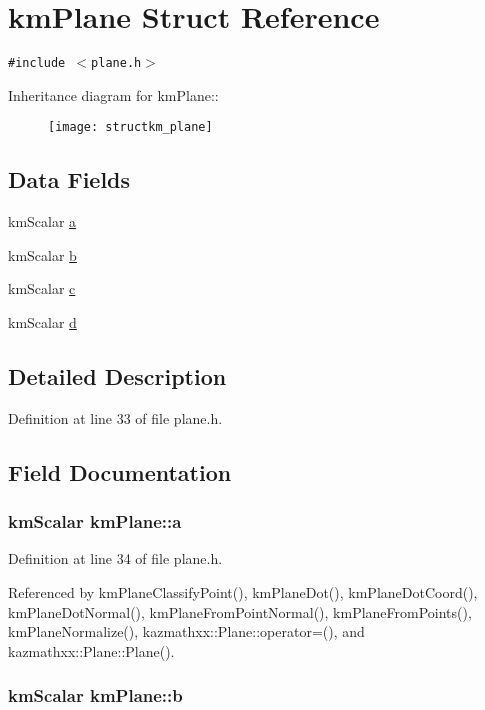 \hypertarget{structkm_plane}{
\section{kmPlane Struct Reference}
\label{structkm_plane}
}
{\tt \#include $<$plane.h$>$}

Inheritance diagram for kmPlane::\begin{figure}[H]
\begin{center}
\leavevmode
\texttt{[image: structkm\_plane]}
\end{center}
\end{figure}
\subsection*{Data Fields}
\begin{CompactItemize}
\item 
kmScalar \hyperlink{structkm_plane_912b0822bfd525570a072d01b0c3b9e1}{a}
\item 
kmScalar \hyperlink{structkm_plane_c16b759b0f6973f00c2c742ec418e2d1}{b}
\item 
kmScalar \hyperlink{structkm_plane_46fb82aee3e4ccec7bb027ba53998600}{c}
\item 
kmScalar \hyperlink{structkm_plane_a3c74528242125229ab0038e9a09b803}{d}
\end{CompactItemize}


\subsection{Detailed Description}


Definition at line 33 of file plane.h.

\subsection{Field Documentation}
\hypertarget{structkm_plane_912b0822bfd525570a072d01b0c3b9e1}{
\subsubsection[a]{\setlength{\rightskip}{0pt plus 5cm}kmScalar {\bf kmPlane::a}}}
\label{structkm_plane_912b0822bfd525570a072d01b0c3b9e1}




Definition at line 34 of file plane.h.

Referenced by kmPlaneClassifyPoint(), kmPlaneDot(), kmPlaneDotCoord(), kmPlaneDotNormal(), kmPlaneFromPointNormal(), kmPlaneFromPoints(), kmPlaneNormalize(), kazmathxx::Plane::operator=(), and kazmathxx::Plane::Plane().\hypertarget{structkm_plane_c16b759b0f6973f00c2c742ec418e2d1}{
\subsubsection[b]{\setlength{\rightskip}{0pt plus 5cm}kmScalar {\bf kmPlane::b}}}
\label{structkm_plane_c16b759b0f6973f00c2c742ec418e2d1}





